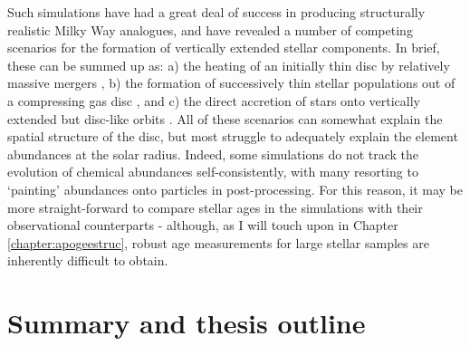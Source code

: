  Such simulations have had a great deal of success in producing structurally realistic Milky Way analogues, and have revealed a number of competing scenarios for the formation of vertically extended stellar components. In brief, these can be summed up as: a) the heating of an initially thin disc by relatively massive mergers \citep[e.g.][]{2004ApJ...612..894B,2008MNRAS.391.1806V,2009ApJ...700.1896K,2013A&A...558A...9M}, b) the formation of successively thin stellar populations out of a compressing gas disc \citep[e.g.][]{2013ApJ...773...43B,2017arXiv170901040N}, and c) the direct accretion of stars onto vertically extended but disc-like orbits \citep[e.g.][]{2003ApJ...597...21A}. All of these scenarios can somewhat explain the spatial structure of the disc, but most struggle to adequately explain the element abundances at the solar radius. Indeed, some simulations do not track the evolution of chemical abundances self-consistently, with many resorting to `painting' abundances onto particles in post-processing. For this reason, it may be more straight-forward to compare stellar ages in the simulations with their observational counterparts - although, as I will touch upon in Chapter \ref{chapter:apogeestruc}, robust age measurements for large stellar samples are inherently difficult to obtain.
 
\section{Summary and thesis outline}





